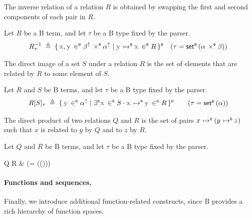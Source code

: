 The inverse relation of a relation \(R\) is obtained by swapping the first and
second components of each pair in \(R\).
\begin{definition}
  \label{def:b-syntax-inv-rel}
  Let \(R\) be a B term, and let \(\tau\) be a B type fixed by the parser.
  \[
    R^{-1}_{\tau} \;\triangleq\; \bcomp{\var{x}, \var{y} \inB \lift{\beta} \prodB \lift{\alpha}}{\var{y} \mapletB \var{x} \inB R} \quad (\tau = \setB(\alpha \prodB \beta))
  \]
\end{definition}

The direct image of a set \(S\) under a relation \(R\) is the set of elements
that are related by \(R\) to some element of \(S\).
\begin{definition}
  \label{def:b-syntax-dir-image}
  Let \(R\) and \(S\) be B terms, and let \(\tau\) be a B type fixed by the parser.
  \[
    R[S]_{\tau} \;\triangleq\; \bcomp{\var{y} \inB \lift{\alpha}}{\existsB \var{x} \inB S \cdot \var{x} \mapletB \var{y} \inB R} \tag{\(\tau = \setB(\alpha)\)}
  \]
\end{definition}

The direct product of two relations \(Q\) and \(R\) is the set of pairs \(x \mathbin{\,\mapsto^{\scriptscriptstyle{\mathsf{B}}}} (y \mathbin{\,\mapsto^{\scriptscriptstyle{\mathsf{B}}}} z)\) such that
\(x\) is related to \(y\) by \(Q\) and to \(z\) by \(R\).
\begin{definition}
  \label{def:b-syntax-dirprod}
  Let \(Q\) and \(R\) be B terms, and let \(\tau\) be a B type fixed by the parser.
  \begin{fitalign}
    Q \dirprodB[\tau] R & \;\triangleq\;  \quad (\tau = \setB(\alpha \prodB (\beta \prodB \gamma)))
  \end{fitalign}
\end{definition}


\paragraph{Functions and sequences.}
Finally, we introduce additional function-related constructs, since B provides a
rich hierarchy of function spaces.

